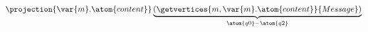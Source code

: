 $
\projection{\var{m}.\atom{content}}
\underbrace{
	\left( \getvertices{m, \var{m}.\atom{content}}{Message} \right)
}_{\atom{q0} - \atom{q2}}
$